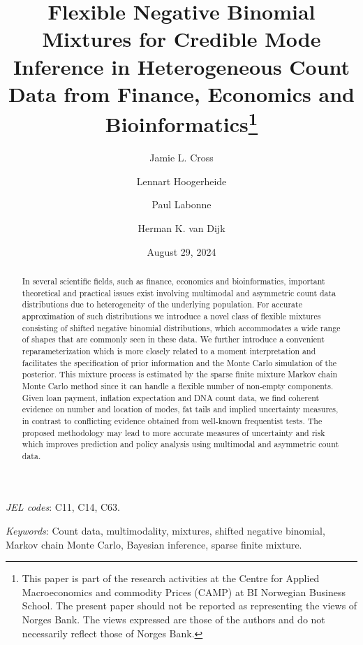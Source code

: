 \documentclass[11pt]{article}
\title{Flexible Negative Binomial Mixtures for Credible Mode Inference in Heterogeneous Count Data from Finance, Economics and Bioinformatics\thanks{This paper is part of the research activities at the Centre for Applied Macroeconomics and commodity Prices (CAMP) at BI Norwegian Business School. The present paper should not be reported as representing the views of Norges Bank. The views expressed are those of the authors and do not necessarily reflect those of Norges Bank.}}
\author[1,2]{Jamie L. Cross}
\author[3,4]{Lennart Hoogerheide}
\author[2]{Paul Labonne}
\author[4,5]{Herman K. van Dijk}
\affil[1]{\small\emph{Melbourne Business School, University of Melbourne}}
\affil[2]{\small\emph{BI Norwegian Business School}}
\affil[3]{\small\emph{Department of Econometrics, VU University Amsterdam}}
\affil[4]{\small\emph{Tinbergen Institute}}
\affil[5]{\small\emph{Erasmus University Rotterdam and Norges Bank}}
\date{August 29, 2024}
\begin{document}
\maketitle
\begin{abstract}
In several scientific fields, such as finance, economics and bioinformatics, important theoretical and practical issues exist involving multimodal and asymmetric count data distributions due to heterogeneity of the underlying population. For accurate approximation of such distributions we introduce a novel class of flexible mixtures consisting of shifted negative binomial distributions, which accommodates a wide range of  shapes that are commonly seen in these data. We further introduce a convenient reparameterization which is more closely related to a moment interpretation and facilitates the specification of prior information and the Monte Carlo simulation of the posterior.  This mixture process is estimated by the sparse finite mixture Markov chain Monte Carlo method since it can handle a flexible number of non-empty components. Given loan payment, inflation expectation and DNA count data, we find coherent evidence on number and location of modes, fat tails and implied uncertainty measures, in contrast to conflicting evidence obtained from well-known frequentist  tests. The proposed methodology may lead to more accurate measures of uncertainty and risk which improves prediction and policy analysis using multimodal and asymmetric count data.

\end{abstract}

\par\noindent\textit{JEL codes}: C11, C14, C63.

\par\noindent\textit{Keywords}: Count data, multimodality, mixtures, shifted negative binomial,  Markov chain Monte Carlo, Bayesian inference, sparse finite mixture.
\end{document}
